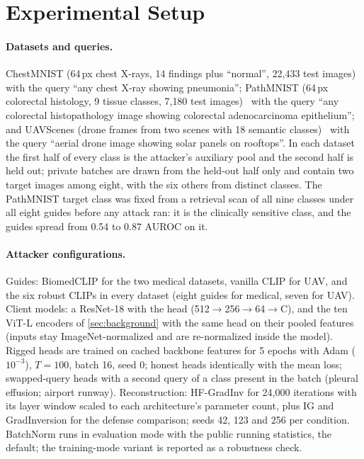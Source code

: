 \section{Experimental Setup}
\label{sec:setup}

\paragraph{Datasets and queries.}
ChestMNIST (64\,px chest X-rays, 14 findings plus ``normal'', 22{,}433 test images)~\cite{medmnistv2} with the query ``any chest X-ray showing pneumonia'';
PathMNIST (64\,px colorectal histology, 9 tissue classes, 7{,}180 test images)~\cite{medmnistv2} with the query ``any colorectal histopathology image showing colorectal adenocarcinoma epithelium'';
and UAVScenes (drone frames from two scenes with 18 semantic classes)~\cite{uavscenes2024} with the query ``aerial drone image showing solar panels on rooftops''.
In each dataset the first half of every class is the attacker's auxiliary pool and the second half is held out; private batches are drawn from the held-out half only and contain two target images among eight, with the six others from distinct classes.
The PathMNIST target class was fixed from a retrieval scan of all nine classes under all eight guides before any attack ran: it is the clinically sensitive class, and the guides spread from 0.54 to 0.87 AUROC on it.

\paragraph{Attacker configurations.}
Guides: BiomedCLIP for the two medical datasets, vanilla CLIP for UAV, and the six robust CLIPs in every dataset (eight guides for medical, seven for UAV).
Client models: a ResNet-18 with the \geminio head (512$\to$256$\to$64$\to$C), and the ten ViT-L encoders of \cref{sec:background} with the same head on their pooled features (inputs stay ImageNet-normalized and are re-normalized inside the model).
Rigged heads are trained on cached backbone features for 5 epochs with Adam ($10^{-3}$), $T=100$, batch 16, seed 0; honest heads identically with the mean loss; swapped-query heads with a second query of a class present in the batch (pleural effusion; airport runway).
Reconstruction: HF-GradInv for 24{,}000 iterations with its layer window scaled to each architecture's parameter count, plus IG and GradInversion for the defense comparison; seeds 42, 123 and 256 per condition.
BatchNorm runs in evaluation mode with the public running statistics, the \geminio default; the training-mode variant is reported as a robustness check.

